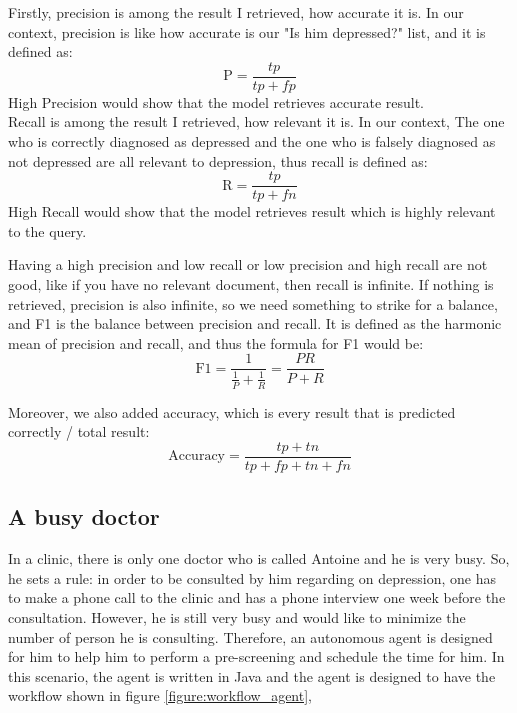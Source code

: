 \documentclass{article}
\begin{document}
	Firstly, precision is among the result I retrieved, how accurate it is.
	In our context, precision is like how accurate is our "Is him depressed?" list, and it is defined as:
     \begin{equation}\label{eq:prediction}
  		\text{P} = \frac{tp}{tp + fp}
	\end{equation}
     High Precision would show that the model retrieves accurate result.\\

	Recall is among the result I retrieved, how relevant it is. 
	In our context, The one who is correctly diagnosed as depressed and the one who is falsely diagnosed as not depressed are all relevant to depression,
	thus recall is defined as:
	\begin{equation}\label{eq:recall}
  		\text{R} = \frac{tp}{tp + fn}
 	\end{equation}
	High Recall would show that the model retrieves result which is highly relevant to the query.

 	Having a high precision and low recall or low precision and high recall are not good, like if you have no relevant document, then recall is infinite.
     If nothing is retrieved, precision is also infinite, so we need something to strike for a balance, 
     and F1 is the balance between precision and recall. It is defined as the harmonic mean of precision and recall, and thus the formula for F1 would be:
     \begin{equation}\label{eq:balance}
  		\text{F1} = \frac{1}{\frac{1}{P} + \frac{1}{R}} = \frac{PR}{P + R}
 	\end{equation}

     Moreover, we also added accuracy, which is every result that is predicted correctly / total result:
     \begin{equation}\label{eq:accuracy}
  		\text{Accuracy} = \frac{tp + tn}{tp + fp + tn + fn}
 	\end{equation}

	\subsection{A busy doctor}
	In a clinic, there is only one doctor who is called Antoine and he is very busy. 
	So, he sets a rule: in order to be consulted by him regarding on depression, 
	one has to make a phone call to the clinic and has a phone interview one week before the consultation. 
	However, he is still very busy and would like to minimize the number of person he is consulting. 
	Therefore, an autonomous agent is designed for him to help him to perform a pre-screening and schedule the time for him.
	In this scenario, the agent is written in Java and the agent is designed to have the workflow shown in figure \ref{figure:workflow_agent},
\end{document}
